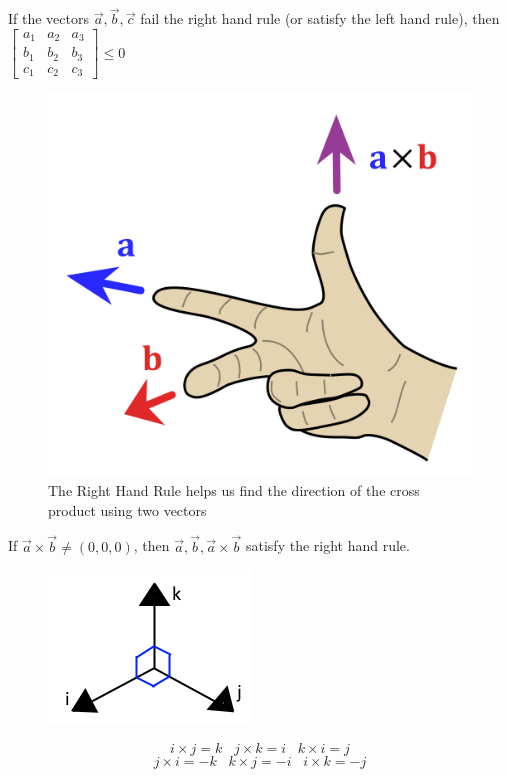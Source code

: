 \documentclass{article}
\begin{document}
If the vectors $\vec{a},\vec{b},\vec{c}$ fail the right hand rule (or satisfy the left hand rule), then $\begin{bmatrix}
    a_1&a_2&a_3\\
    b_1&b_2&b_3\\
    c_1&c_2&c_3
\end{bmatrix}\leq 0$
\begin{figure}[h!]
    \centering
    \includegraphics[scale=.1]{RightHandRule.png}
    \caption{The Right Hand Rule helps us find the direction of the cross product using two vectors}
    \label{}
\end{figure}
\newline
If $\vec{a}\times\vec{b}\neq(0,0,0)$, then $\vec{a},\vec{b},\vec{a}\times\vec{b}$ satisfy the right hand rule.

\begin{figure}[h!]
    \centering
    \includegraphics[scale=.5]{triplesign.png}
    \caption{}
    \label{}
\end{figure}
\[i×j=k\;\;\;j×k=i\;\;\;k×i=j\]
\[j×i=−k\;\;\;k×j=−i\;\;\;i×k=−j\]
\end{document}
